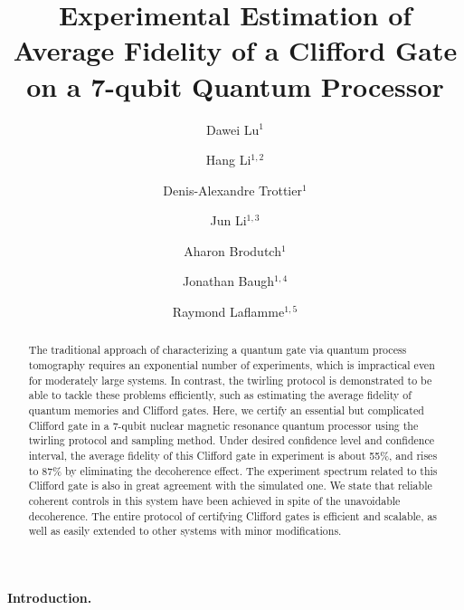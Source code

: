 \documentclass[prl,twocolumn,showpacs]{revtex4-1}
\begin{document}
\title{Experimental Estimation of Average Fidelity of a Clifford Gate on a 7-qubit Quantum Processor}
\author{Dawei Lu$^{1}$}
\author{Hang Li$^{1,2}$}
\author{Denis-Alexandre Trottier$^{1}$}
\author{Jun Li$^{1,3}$}
\author{Aharon Brodutch$^{1}$}
\author{Jonathan Baugh$^{1,4}$}
\author{Raymond Laflamme$^{1,5}$}




\begin{abstract}
The traditional approach of characterizing a quantum gate via quantum process tomography requires an exponential number of experiments, which is impractical even for moderately large systems. In contrast, the twirling protocol is demonstrated to be able to tackle these problems efficiently, such as estimating the average fidelity of quantum memories and Clifford gates. Here, we certify an essential but complicated Clifford gate in a 7-qubit nuclear magnetic resonance quantum processor using the twirling protocol and sampling method. Under desired confidence level and confidence interval, the average fidelity of this Clifford gate in experiment is about 55\%, and rises to 87\% by eliminating the decoherence effect. The experiment spectrum related to this Clifford gate is also in great agreement with the simulated one. We state that reliable coherent controls in this system have been achieved in spite of the unavoidable decoherence. The entire protocol of certifying Clifford gates is efficient and scalable, as well as easily extended to other systems with minor modifications.
\end{abstract}

\maketitle



\paragraph*{Introduction.}
\end{document}
